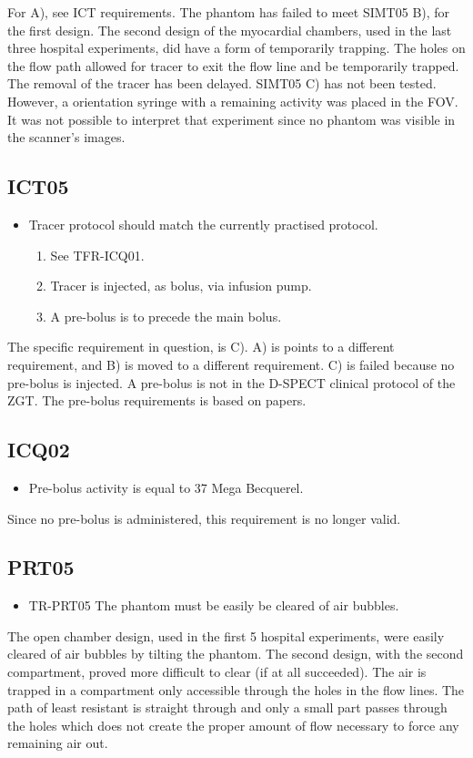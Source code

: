 For A), see ICT requirements. The phantom has failed to meet SIMT05 B), for the first design. The second design of the myocardial chambers, used in the last three hospital experiments, did have a form of temporarily trapping. The holes on the flow path allowed for tracer to exit the flow line and be temporarily trapped. The removal of the tracer has been delayed. SIMT05 C) has not been tested. However, a orientation syringe with a remaining activity was placed in the FOV. It was not possible to interpret that experiment since no phantom was visible in the scanner's images.

\subsection*{ICT05}
\begin{itemize}
	\item Tracer protocol should match the currently practised protocol. 
	\begin{enumerate}[label=\Alph*, noitemsep]
		\item See TFR-ICQ01.
		\item Tracer is injected, as bolus, via infusion pump.
		\item A pre-bolus is to precede the main bolus.
	\end{enumerate}
\end{itemize}
The specific requirement in question, is C). A) is points to a different requirement, and B) is moved to a different requirement. C) is failed because no pre-bolus is injected. A pre-bolus is not in the D-SPECT clinical protocol of the ZGT. The pre-bolus requirements is based on papers.

\subsection*{ICQ02}
\begin{itemize}
	\item Pre-bolus activity is equal to 37 Mega Becquerel.
\end{itemize}
Since no pre-bolus is administered, this requirement is no longer valid.

\subsection*{PRT05}
\begin{itemize}
	\item TR-PRT05 The phantom must be easily be cleared of air bubbles.
\end{itemize}
The open chamber design, used in the first 5 hospital experiments, were easily cleared of air bubbles by tilting the phantom. The second design, with the second compartment, proved more difficult to clear (if at all succeeded). The air is trapped in a compartment only accessible through the holes in the flow lines. The path of least resistant is straight through and only a small part passes through the holes which does not create the proper amount of flow necessary to force any remaining  air out.

